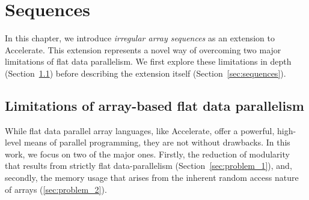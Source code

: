 \chapter{Sequences}
\label{chap:motivation}


In this chapter, we introduce \emph{irregular array sequences} as an extension to Accelerate. This extension represents a novel way of overcoming two major limitations of flat data parallelism. We first explore these limitations in depth (Section~\ref{sec:limitations}) before describing the extension itself (Section~\ref{sec:sequences}).




\section{Limitations of array-based flat data parallelism}
\label{sec:limitations}
While flat data parallel array languages, like Accelerate, offer a powerful, high-level means of parallel programming, they are not without drawbacks. In this work, we focus on two of the major ones. Firstly, the reduction of modularity that results from strictly flat data-parallelism (Section~\ref{sec:problem_1}), and, secondly, the memory usage that arises from the inherent random access nature of arrays (\ref{sec:problem_2}).


